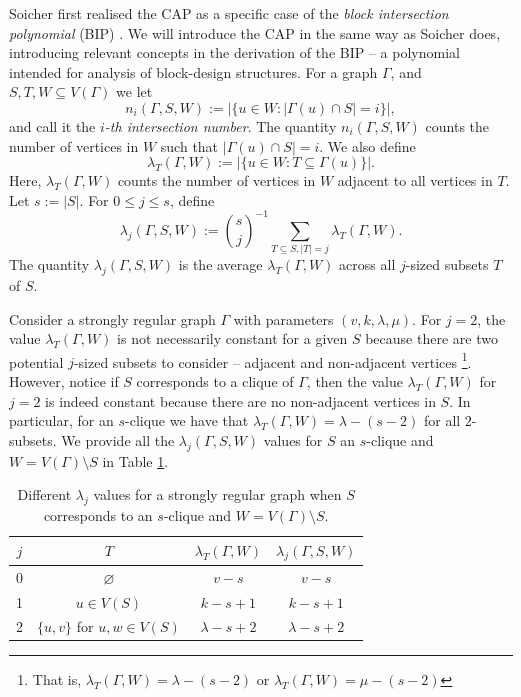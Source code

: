 \documentclass[11pt, baustms]{amsproc}
\theoremstyle{scplain}
\renewcommand\le{\leqslant}
\begin{document}
Soicher first realised the CAP as a specific case of the \textit{block intersection polynomial} (BIP) \cite{soicher_more_2010}. We will introduce the CAP in the same way as Soicher does, introducing relevant concepts in the derivation of the BIP -- a polynomial intended for analysis of block-design structures. For a graph $\Gamma$, and $S, T, W \subseteq V(\Gamma)$ we let 
\begin{equation*} 
		n_i (\Gamma, S, W ) := \left|\{u \in W : \left| \Gamma(u) \cap S\right|=i\}\right|,
\end{equation*} 
and call it the \emph{$i$-th intersection number}. The quantity $n_i (\Gamma, S, W )$ counts the number of vertices in $W$ such that $\left|\Gamma(u) \cap S\right| = i$. We also define
\begin{equation*}
    \lambda_T (\Gamma, W) := |\{u \in W: T \subseteq \Gamma(u)\}|. 
\end{equation*}
Here, $\lambda_T(\Gamma, W)$ counts the number of vertices in $W$ adjacent to all vertices in $T$. 
Let $s := |S|$. For $0 \le j \le s$, define
\begin{equation*} 
    \lambda_j (\Gamma, S, W) := \binom{s}{j}^{-1} \sum_{T \subseteq S, |T|=j}\lambda_T (\Gamma, W).
\end{equation*}  
The quantity $\lambda_j (\Gamma, S, W)$ is the average $\lambda_T (\Gamma, W)$ across all $j$-sized subsets $T$ of $S$. 

Consider a strongly regular graph $\Gamma$ with parameters $(v,k,\lambda, \mu)$. For $j=2$, the value $\lambda_T(\Gamma, W)$ is not necessarily constant for a given $S$ because there are two potential $j$-sized subsets to consider -- adjacent and non-adjacent vertices \footnote{That is, $\lambda_T(\Gamma, W) = \lambda-(s-2)$ or $\lambda_T(\Gamma, W) = \mu-(s-2)$}. However, notice if $S$ corresponds to a clique of $\Gamma$, then the value $\lambda_T(\Gamma, W)$ for $j=2$ is indeed constant because there are no non-adjacent vertices in $S$. In particular, for an $s$-clique we have that $\lambda_T(\Gamma, W) = \lambda-(s-2)$ for all $2$-subsets. We provide all the $\lambda_j(\Gamma, S, W)$ values for $S$ an $s$-clique and $W = V(\Gamma) \setminus S$ in Table \ref{tab:gen1}.

	\begin{table}[!ht]
		\centering
		\begin{tabular}{c c c c}
			$j$ & $T$ & $\lambda_T (\Gamma, W)$ & $\lambda_j (\Gamma, S, W)$ \\
			\midrule
			0 & $\varnothing $ & $v-s$ & $v-s$ \\
			1 & $u \in V(S)$ & $k-s+1$ & $ k-s+1$ \\
			2 & $\{u,v\}$ for $u,w \in V(S)$ & $\lambda-s+2$ & $\lambda-s+2$ \\
			\bottomrule
		\end{tabular}
		\caption{Different $\lambda_j$ values for a strongly regular graph when $S$ corresponds to an $s$-clique and $W = V(\Gamma) \setminus S$.}
		\label{tab:gen1}
	\end{table}
\end{document}
